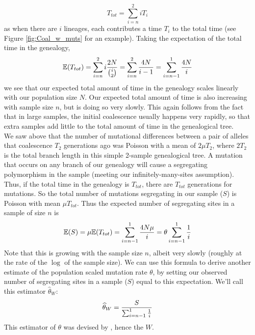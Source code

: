 \begin{equation}
T_{tot} = \sum_{i=n}^2 iT_i
\end{equation}
as when there are $i$ lineages, each contributes a time $T_i$ to the total time (see Figure \ref{fig:Coal_w_muts} for an example). Taking the expectation of the total time in the genealogy,
\begin{equation}
\E(T_{tot}) = \sum_{i=n}^2 i \frac{2N}{{i \choose
 2} } = \sum_{i=n}^2 \frac{4N}{i -1} =\sum_{i=n-1}^1 \frac{4N}{i} \label{eqn:E_T_tot}
\end{equation}
we see that our expected total amount of time in the genealogy scales linearly
with our population size $N$. Our expected total amount of time is also
increasing with sample size $n$, but is doing so very slowly. %
This again follows
from the fact that in large samples, the initial coalescence usually
happens very rapidly, so that extra samples add little to the total
amount of time in the genealogical tree. \\

We saw above that the number of mutational differences between a pair
of alleles that coalescence $T_2$ generations ago was Poisson with a
mean of $2 \mu T_2$, where $2T_{2}$ is the total branch length in this simple 2-sample genealogical tree. A mutation that occurs on any branch of our
genealogy will cause a segregating polymorphism in the sample
(meeting our infinitely-many-sites assumption). Thus, if the total time
in the genealogy is $T_{tot}$, there are $T_{tot}$
generations for mutations. So the total number of mutations
segregating in our sample ($S$) is Poisson with mean $\mu T_{tot}$. Thus the
expected number of segregating  sites in a sample of size $n$ is
\begin{equation}
\E(S) = \mu \E(T_{tot}) = \sum_{i=n-1}^1 \frac{4N\mu }{i} = \theta
\sum_{i=n-1}^1 \frac{1}{i}
\end{equation}
Note that this is growing with the sample size $n$, albeit very slowly (roughly at the rate of the $\log$ of the sample size).
We can use this formula to derive another estimate of the population scaled mutation rate $\theta$, by setting our observed number of segregating sites in a sample ($S$) equal to this expectation. We'll call this estimator $\widehat{\theta}_W$:
\begin{equation}
\widehat{\theta}_W =\frac{ S}{\sum_{i=n-1}^1 \nicefrac{1}{i}}   \label{watterson_theta}
\end{equation}
This estimator of $\theta$ was devised by \citet{watterson:75}, hence the $W$.



